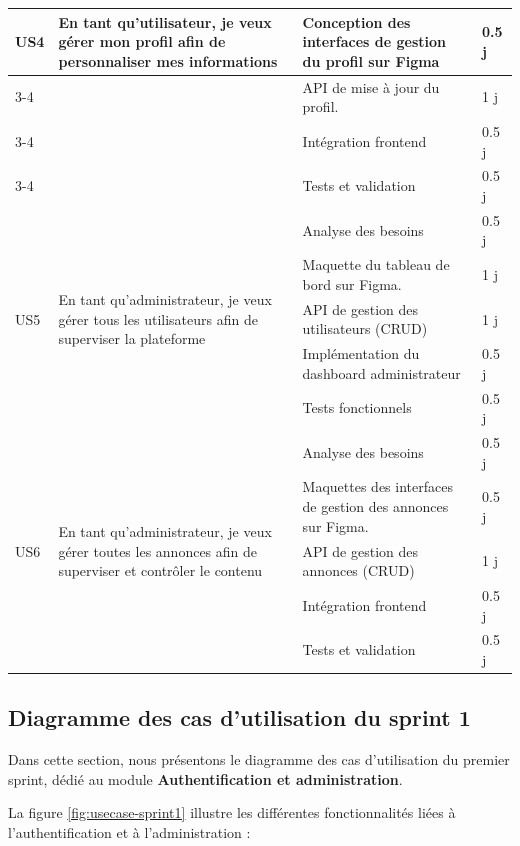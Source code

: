 \begin{longtable}{|p{1cm}|p{4.7cm}|p{7cm}|p{1.3cm}|}
\multirow{4}{2cm}{US4}
& \multirow{4}{5cm}{En tant qu’utilisateur, je veux gérer mon profil afin de personnaliser mes informations}
& Conception des interfaces de gestion du profil sur Figma & 0.5 j \\
\cline{3-4}
& & API de mise à jour du profil.& 1 j \\
\cline{3-4}
& & Intégration frontend & 0.5 j \\
\cline{3-4}
& & Tests et validation & 0.5 j \\
\hline

\multirow{5}{2cm}{US5}
& \multirow{5}{5cm}{En tant qu’administrateur, je veux gérer tous les utilisateurs afin de superviser la plateforme}
& Analyse des besoins & 0.5 j \\
\cline{3-4}
& & Maquette du tableau de bord sur Figma. & 1 j \\
\cline{3-4}
& & API de gestion des utilisateurs (CRUD) & 1 j \\
\cline{3-4}
& & Implémentation du dashboard administrateur & 0.5 j \\
\cline{3-4}
& & Tests fonctionnels & 0.5 j \\
\hline

\multirow{5}{2cm}{US6}
& \multirow{5}{5cm}{En tant qu’administrateur, je veux gérer toutes les annonces afin de superviser et contrôler le contenu}
& Analyse des besoins & 0.5 j \\
\cline{3-4}
& & Maquettes des interfaces de gestion des annonces sur Figma. & 0.5 j \\
\cline{3-4}
& &API de gestion des annonces (CRUD) & 1 j \\
\cline{3-4}
& & Intégration frontend & 0.5 j \\
\cline{3-4}
& & Tests et validation& 0.5 j \\
\hline

\end{longtable}

\newpage
\subsection{Diagramme des cas d’utilisation du sprint 1}
Dans cette section, nous présentons le diagramme des cas d’utilisation du premier sprint, dédié au module \textbf{Authentification et administration}. 

La figure \ref{fig:usecase-sprint1} illustre les différentes fonctionnalités liées à l’authentification et à l’administration :  

